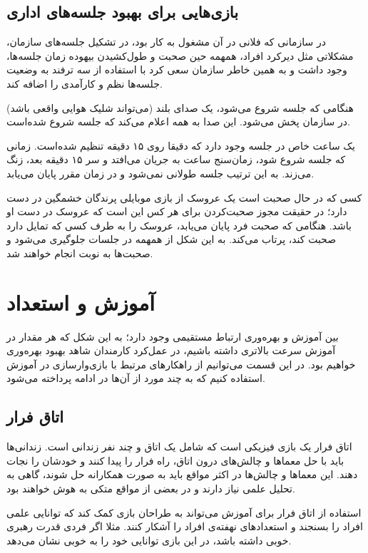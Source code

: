 \subsection{بازی‌هایی برای بهبود جلسه‌های اداری}
در سازمانی که فلانی %
در آن مشغول به کار بود، در تشکیل جلسه‌های سازمان، مشکلاتی مثل دیرکرد افراد، همهمه حین صحبت و طول‌کشیدن بیهوده زمان جلسه‌ها، وجود داشت و به همین خاطر سازمان سعی کرد با استفاده از سه ترفند به وضعیت جلسه‌ها نظم و کارآمدی را اضافه کند.
\begin{trick}
هنگامی که جلسه شروع می‌شود، یک صدای بلند (می‌تواند شلیک هوایی واقعی باشد) در سازمان پخش می‌شود. این صدا به همه اعلام می‌کند که جلسه شروع شده‌است.
\end{trick}
\begin{trick}
یک ساعت خاص در جلسه وجود دارد که دقیقا روی ۱۵ دقیقه تنظیم شده‌است. زمانی که جلسه شروع شود، زمان‌سنج ساعت به جریان می‌افتد و سر ۱۵ دقیقه بعد، زنگ می‌زند. به این ترتیب جلسه طولانی نمی‌شود و در زمان مقرر پایان می‌یابد.
\end{trick}
\begin{trick}
کسی که در حال صحبت است یک عروسک از بازی موبایلی پرندگان خشمگین در دست دارد؛ در حقیقت مجوز صحبت‌کردن برای هر کس این است که عروسک در دست او باشد. هنگامی که صحبت فرد پایان می‌یابد، عروسک را به طرف کسی که تمایل دارد صحبت کند، پرتاب می‌کند. به این شکل از همهمه در جلسات جلوگیری می‌شود و صحبت‌ها به نوبت انجام خواهند شد.
\end{trick}
\section{آموزش و استعداد}
بین آموزش و بهره‌وری ارتباط مستقیمی وجود دارد؛ به این شکل که هر مقدار در آموزش سرعت بالاتری داشته باشیم، در عمل‌کرد کارمندان شاهد بهبود بهره‌وری خواهیم بود. در این قسمت می‌توانیم از راهکارهای مرتبط با بازی‌وارسازی در آموزش استفاده کنیم که به چند مورد از آن‌ها در ادامه پرداخته می‌شود.
\subsection{اتاق فرار}
اتاق فرار یک بازی فیزیکی است که شامل یک اتاق و چند نفر زندانی است. زندانی‌ها باید با حل معماها و چالش‌های درون اتاق، راه فرار را پیدا کنند و خودشان را نجات دهند. این معماها و چالش‌ها در اکثر مواقع باید به صورت همکارانه حل شوند، گاهی به تحلیل علمی نیاز دارند و در بعضی از مواقع متکی به هوش خواهند بود.

استفاده از اتاق فرار برای آموزش می‌تواند به طراحان بازی کمک کند که توانایی علمی افراد را بسنجند و استعدادهای نهفته‌ی افراد را آشکار کنند. مثلا اگر فردی قدرت رهبری خوبی داشته باشد، در این بازی توانایی خود را به خوبی نشان می‌دهد.
